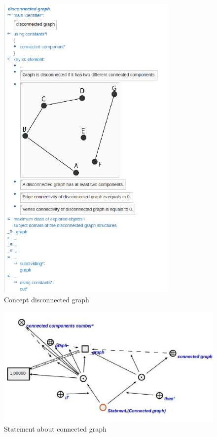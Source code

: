\documentclass[twocolumn]{scndocument}
\begin{document}
\begin{figure}[H]
    \centering
    \includegraphics[width=0.9\linewidth]{2.jpg}
    \caption{Concept disconnected graph}
\end{figure}

\begin{figure}[H]
    \centering
    \includegraphics[width=0.9\linewidth]{3.jpg}
    \caption{Statement about connected graph}
\end{figure}
\end{document}
